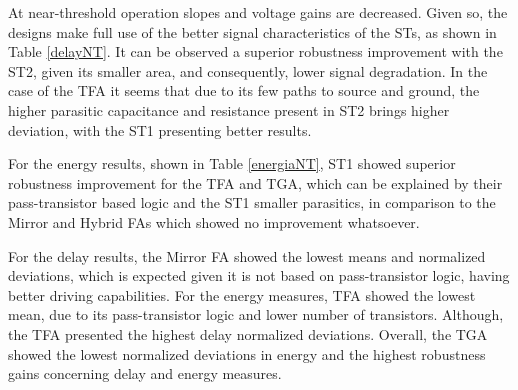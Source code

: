 \documentclass[diss,pgmicro,english]{iiufrgs}
\begin{document}
 At near-threshold operation slopes and voltage gains are decreased. Given so, the designs make full use of the better signal characteristics of the STs, as shown in Table \ref{delayNT}. It can be observed a superior robustness improvement with the ST2, given its smaller area, and consequently, lower signal degradation. In the case of the TFA it seems that due to its few paths to source and ground, the higher parasitic capacitance and resistance present in ST2 brings higher deviation, with the ST1 presenting better results.

 For the energy results, shown in Table \ref{energiaNT}, ST1 showed superior robustness improvement for the TFA and TGA, which can be explained by their pass-transistor based logic and the ST1 smaller parasitics, in comparison to the Mirror and Hybrid FAs which showed no improvement whatsoever.

 For the delay results, the Mirror FA showed the lowest means and normalized deviations, which is expected given it is not based on pass-transistor logic, having better driving capabilities. For the energy measures, TFA showed the lowest mean, due to its pass-transistor logic and lower number of transistors. Although, the TFA presented the highest delay normalized deviations. Overall, the TGA showed the lowest normalized deviations in energy and the highest robustness gains concerning delay and energy measures.
\end{document}
